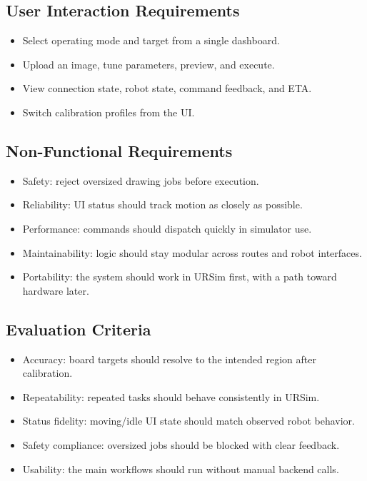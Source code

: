 \documentclass[12pt]{article}
\begin{document}
\subsection{User Interaction Requirements}
\begin{itemize}[leftmargin=*]
\item Select operating mode and target from a single dashboard.
\item Upload an image, tune parameters, preview, and execute.
\item View connection state, robot state, command feedback, and ETA.
\item Switch calibration profiles from the UI.
\end{itemize}

\subsection{Non-Functional Requirements}
\begin{itemize}[leftmargin=*]
\item Safety: reject oversized drawing jobs before execution.
\item Reliability: UI status should track motion as closely as possible.
\item Performance: commands should dispatch quickly in simulator use.
\item Maintainability: logic should stay modular across routes and robot interfaces.
\item Portability: the system should work in URSim first, with a path toward hardware later.
\end{itemize}

\subsection{Evaluation Criteria}
\begin{itemize}[leftmargin=*]
\item Accuracy: board targets should resolve to the intended region after calibration.
\item Repeatability: repeated tasks should behave consistently in URSim.
\item Status fidelity: moving/idle UI state should match observed robot behavior.
\item Safety compliance: oversized jobs should be blocked with clear feedback.
\item Usability: the main workflows should run without manual backend calls.
\end{itemize}
\end{document}
